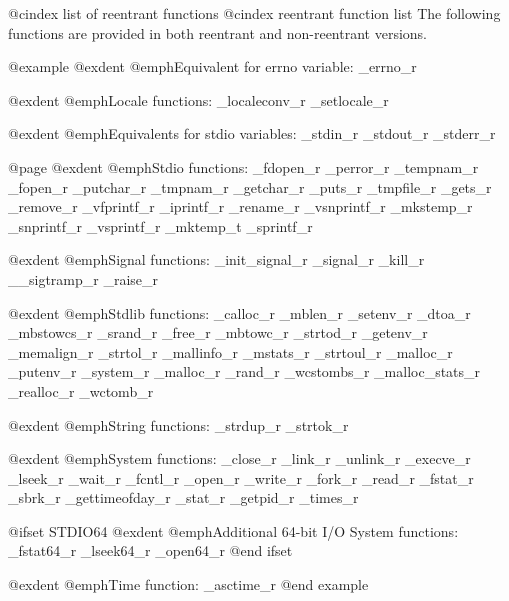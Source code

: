 @cindex list of reentrant functions
@cindex reentrant function list
The following functions are provided in both reentrant
and non-reentrant versions.

@example
@exdent @emph{Equivalent for errno variable:}
_errno_r

@exdent @emph{Locale functions:}
_localeconv_r  _setlocale_r

@exdent @emph{Equivalents for stdio variables:}
_stdin_r        _stdout_r       _stderr_r

@page  
@exdent @emph{Stdio functions:}
_fdopen_r       _perror_r       _tempnam_r
_fopen_r        _putchar_r      _tmpnam_r
_getchar_r      _puts_r         _tmpfile_r
_gets_r         _remove_r       _vfprintf_r
_iprintf_r      _rename_r       _vsnprintf_r
_mkstemp_r      _snprintf_r     _vsprintf_r
_mktemp_t       _sprintf_r

@exdent @emph{Signal functions:}
_init_signal_r  _signal_r
_kill_r         __sigtramp_r
_raise_r

@exdent @emph{Stdlib functions:}
_calloc_r       _mblen_r        _setenv_r
_dtoa_r         _mbstowcs_r     _srand_r
_free_r         _mbtowc_r       _strtod_r
_getenv_r       _memalign_r     _strtol_r
_mallinfo_r     _mstats_r       _strtoul_r
_malloc_r       _putenv_r       _system_r
_malloc_r       _rand_r         _wcstombs_r
_malloc_stats_r _realloc_r      _wctomb_r

@exdent @emph{String functions:}
_strdup_r       _strtok_r

@exdent @emph{System functions:}
_close_r        _link_r         _unlink_r
_execve_r       _lseek_r        _wait_r
_fcntl_r        _open_r         _write_r 
_fork_r         _read_r
_fstat_r        _sbrk_r
_gettimeofday_r _stat_r
_getpid_r       _times_r

@ifset STDIO64
@exdent @emph{Additional 64-bit I/O System functions:}
_fstat64_r	_lseek64_r	_open64_r
@end ifset

@exdent @emph{Time function:}
_asctime_r
@end example
